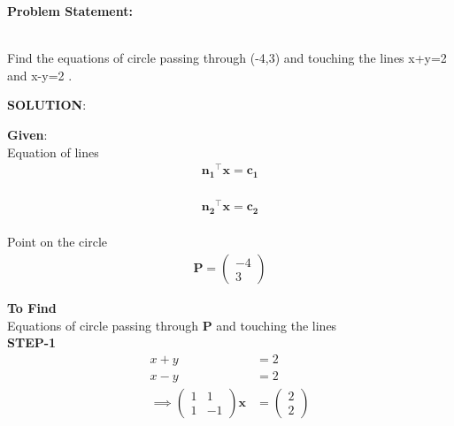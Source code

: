\documentclass[10pt,a4paper]{report}
\newcommand{\myvec}[1]{\ensuremath{\begin{pmatrix}#1\end{pmatrix}}}
\let\vec\mathbf
\let\vec\mathbf
\begin{document}
\begin{multicols}{2}

\raggedright \textbf{Problem Statement:}\vspace{2mm}
\raggedright \\Find the equations of circle passing through (-4,3) and touching the lines x+y=2 and x-y=2 .\\
\vspace{5mm}

\raggedright \textbf{SOLUTION}:\vspace{2mm}\\

\raggedright \textbf{Given}:\vspace{2mm}\\
Equation of lines\\ 
\begin{align}
    \label{eq:line_norm_eq}
	\vec{n_1}^{\top}\vec{x} =\vec{c_1} 
\end{align}\\  
\begin{align}
    \label{eq:line_norm_eq1}
	\vec{n_2}^{\top}\vec{x} =\vec{c_2} 
\end{align}\\  
 \vspace{1mm}
Point on the circle\begin{align}
\vec{P}=\myvec{-4\\
3}
\end{align}


\textbf{To Find }\vspace{2mm}\\
Equations of circle  passing through $\vec{P}$ and touching the lines \vspace{5mm}  \\ 
\textbf{STEP-1}\vspace{2mm}\\
 \begin{align}
			    x  +y &= 2
			    \\
			    x -y  &= 2
			    \\
			    \implies 
			    \myvec{1 &  1
			    \\
			    1 & -1}\vec{x} &= \myvec{2 \\ 2}
		    \end{align}
		    

\end{multicols}
\end{document}
